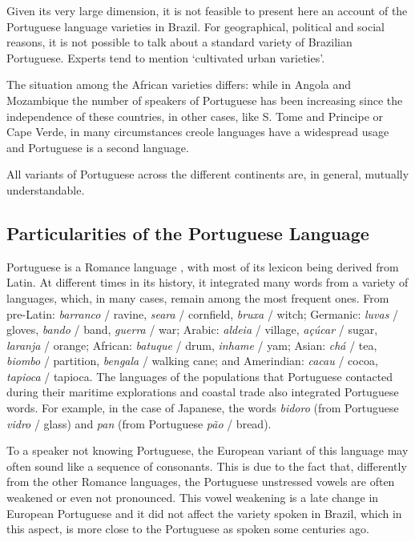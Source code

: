 \begin{multicols}{2}
Given its very large dimension, it is not feasible to present here an account of the Portuguese language varieties in Brazil. 
For geographical, political and social reasons, it is not possible to talk about a standard variety of Brazilian Portuguese. 
Experts tend to mention ‘cultivated urban varieties’. 

The situation among the African varieties differs: while in Angola and Mozambique the number of speakers of Portuguese has been increasing since the independence of these countries, in other cases, like S. Tome and Principe or Cape Verde, in many circumstances creole languages have a widespread usage and Portuguese is a second language.

All variants of Portuguese across the different continents are, in general, mutually understandable.

\subsection{Particularities of the Portuguese Language}

Portuguese is a Romance language \cite{cardeira}, with most of its lexicon being derived from Latin. 
At different times in its history, it integrated many words from a variety of languages, which, in many cases, remain among 
the most frequent ones. From pre-Latin: \textit{barranco} / ravine, \textit{seara} / cornfield,  \textit{bruxa} / witch; Germanic:  \textit{luvas} / gloves,  \textit{bando} / band,  \textit{guerra} / war; Arabic:  \textit{aldeia} / village,  \textit{açúcar} / sugar,  \textit{laranja} / orange; African: \textit{batuque} / drum, \textit{inhame} / yam; Asian: \textit{chá} / tea, \textit{biombo} / partition, \textit{bengala} / walking cane; and Amerindian: \textit{cacau} / cocoa, \textit{tapioca} / tapioca. The languages of the populations that Portuguese contacted during their maritime explorations and coastal trade also integrated Portuguese words. For example, in the case of Japanese, the words \textit{bidoro} (from Portuguese \textit{vidro} / glass) and \textit{pan} (from Portuguese \textit{pão} / bread).


To a speaker not knowing Portuguese, the European variant of this language may often sound like a sequence of consonants. 
This is due to the fact that, differently from the other Romance languages, the Portuguese unstressed vowels are often weakened 
or even not pronounced. This vowel weakening is a late change in European Portuguese and it did not 
affect the variety spoken in Brazil, which in this aspect, is more close to the Portuguese as spoken some centuries ago.


\end{multicols}
